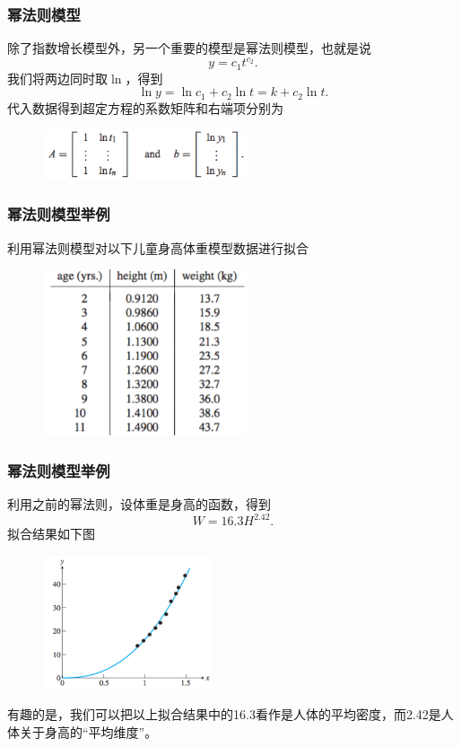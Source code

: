\documentclass[10pt]{beamer}
\begin{document}
\begin{frame}
\frametitle{幂法则模型}
除了指数增长模型外，另一个重要的模型是幂法则模型，也就是说
\begin{equation}
y = c_1 t^{c_2}.
\end{equation}
我们将两边同时取$\ln$，得到
\begin{equation}
\ln y = \ln c_1 + c_2 \ln t = k + c_2 \ln t.
\end{equation}
代入数据得到超定方程的系数矩阵和右端项分别为
\begin{figure}
\includegraphics[width=6cm]{figs/4-2-2_Power_Law-1} 
\end{figure}
\end{frame}


\begin{frame}
\frametitle{幂法则模型举例}
\begin{example}
利用幂法则模型对以下儿童身高体重模型数据进行拟合
\begin{figure}
\includegraphics[width=6cm]{figs/4-2-2_Power_Law-2} 
\end{figure}
\end{example}
\end{frame}


\begin{frame}
\frametitle{幂法则模型举例}
利用之前的幂法则，设体重是身高的函数，得到
\begin{equation}
W = 16.3 H^{2.42}.
\end{equation}
拟合结果如下图
\begin{figure}
\includegraphics[width=5cm]{figs/4-2-2_Power_Law-3} 
\end{figure}
有趣的是，我们可以把以上拟合结果中的16.3看作是人体的平均密度，而2.42是人体关于身高的“平均维度”。
\end{frame}
\end{document}
